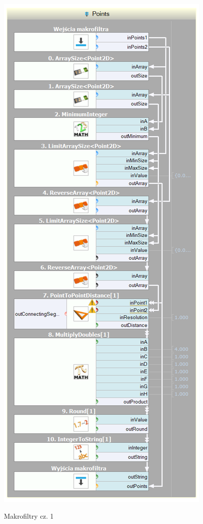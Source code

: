 \documentclass[11pt, a4paper]{article}
\begin{document}
\begin{figure}[p!]
{		\includegraphics[width = \www \linewidth]{pro4}%
		\label{fig:points}%
	}%
	
	\caption{Makrofiltry cz. 1}
	\label{fig:makro1}
\end{figure}
\end{document}
